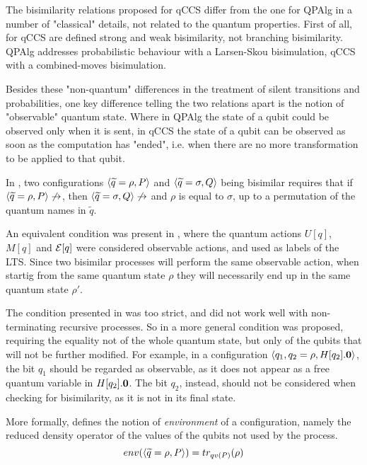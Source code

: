 The bisimilarity relations proposed for qCCS differ from the one for QPAlg in a number of "classical" details, not related to the quantum properties. First of all, for qCCS are defined strong and weak bisimilarity, not branching bisimilarity. QPAlg addresses probabilistic behaviour with a Larsen-Skou bisimulation, qCCS with a combined-moves bisimulation.

Besides these "non-quantum" differences in the treatment of silent transitions and probabilities, one key difference telling the two relations apart is the notion of "observable" quantum state. Where in QPAlg the state of a qubit could be observed only when it is sent, in qCCS the state of a qubit can be observed as soon as the computation has "ended", i.e. when there are no more transformation to be applied to that qubit.

In  \cite{fengProbabilisticBisimulationsQuantum2007}, two configurations $\langle\widetilde{q} = \rho, P\rangle$ and $\langle\widetilde{q} = \sigma, Q\rangle$ being bisimilar requires that if $\langle\widetilde{q} = \rho, P\rangle \not\rightarrow$, then $\langle\widetilde{q} = \sigma, Q\rangle \not\rightarrow$ and $\rho$ is equal to $\sigma$, up to a permutation of the quantum names in $\widetilde{q}$. 

An equivalent condition was present in \cite{yingAlgebraQuantumProcesses2010}, where the quantum actions $U[q]$, $M[q]$ and $\mathcal{E}[q]$ were considered observable actions, and used as labels of the LTS. Since two bisimilar processes will perform the same observable action, when startig from the same quantum state $\rho$ they will necessarily end up in the same quantum state $\rho'$.

The condition presented in \cite{fengProbabilisticBisimulationsQuantum2007} was too strict, and did not work well with non-terminating recursive processes. So in \cite{fengBisimulationQuantumProcesses2012} a more general condition was proposed, requiring the equality not of the whole quantum state, but only of the qubits that will not be further modified. For example, in a configuration $\langle q_1, q_2 = \rho, H[q_2].\mathbf{0}\rangle$, the bit $q_1$ should be regarded as observable, as it does not appear as a free quantum variable in $H[q_2].\mathbf{0}$. The bit $q_2$, instead, should not be considered when checking for bisimilarity, as it is not in its final state.

More formally, \cite{fengBisimulationQuantumProcesses2012} defines the notion of \textit{environment} of a configuration, namely the reduced density operator of the values of the qubits not used by the process.
\[env(\langle\widetilde{q} = \rho, P\rangle) = tr_{qv(P)}(\rho)\]


